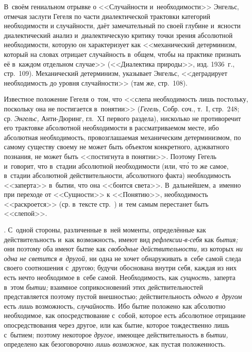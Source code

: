 {В~своём гениальном отрывке о <<Случайности и~необходимости>> Энгельс, отмечая
заслуги Гегеля по части диалектической трактовки категорий необходимости и
случайности, даёт замечательный по своей глубине и~ясности диалектический
анализ и~диалектическую критику точки зрения абсолютной необходимости,
которую он характеризует как <<механический детерминизм, который на словах
отрицает случайность в~общем, чтобы на практике признать её в~каждом
отдельном случае>> (<<Диалектика природы>>, изд. 1936~г., стр.~109).
Механический детерминизм, указывает Энгельс, <<деградирует необходимость до
уровня случайности>> (там же, стр.~108).

Известное положение Гегеля о~том, что <<слепа необходимость лишь постольку,
поскольку она не постигается в~понятии>> ({\em Гегель,} Собр. соч., т.~I,
стр.~248; ср. {\em Энгельс,} Анти-Дюринг, гл.~XI первого раздела),
нисколько не противоречит его трактовке абсолютной необходимости в
рассматриваемом месте, ибо абсолютная необходимость, провозглашаемая
механическим детерминизмом, по самому существу своему не может быть
объектом конкретного, адэкватного познания, не может быть <<постигнута в
понятии>>. Поэтому Гегель и~говорит, что в~стадии абсолютной необходимости
(или, чт\'{о} то же самое, в~стадии абсолютной действительности, абсолютного
факта) необходимость <<заперта>> в~бытии, что она <<боится света>>.
В~дальнейшем, а~именно при переходе от <<Сущности>> к <<Понятию>>,
необходимость <<раскроется>> (ср. в~тексте стр.~\pageref{bkm:bm93a}) и~тем
самым перестанет быть <<слепой>>.}.
С~одной стороны, различенные в~ней моменты, определённые как
действительность и~как возможность, имеют вид
{\em рефлексии-в-себя} как {\em бытия;} они поэтому оба имеют бытие как
{\em свободные действительности,} из которых
{\em ни одна не светится в~другой,} ни одна не хочет
обнаруживать в~себе самой следа своего соотношения с~другою; будучи
обоснована внутри себя, каждая из них есть нечто необходимое в~себе самой.
Необходимость, как {\em сущность,} заперта в~этом
{\em бытии;} взаимное соприкосновений этих
действительностей представляется поэтому пустой внешностью;
действительность {\em одного в~другом} есть {\em лишь} возможность,
{\em случайность}. Ибо бытие положено как абсолютно
необходимое, как опосредствование с~собой, которое есть абсолютное
отрицание опосредствования через другое, или как бытие, которое
тождественно лишь с~бытием; поэтому некоторое
{\em другое,} имеющее действительность в
{\em бытии,} определено как безоговорочно
{\em лишь возможное,} как пустая положенность.

